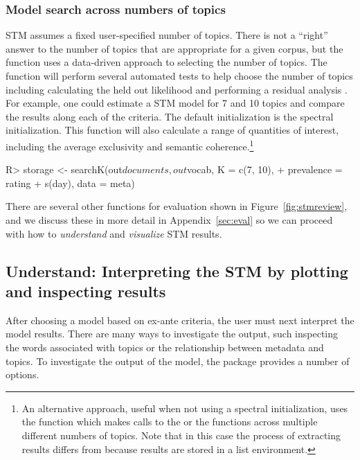 \documentclass[article,shortnames]{jss}
\begin{document}
\subsubsection{Model search across numbers of topics}

STM assumes a fixed user-specified number of topics. There is not a ``right'' answer to the number of topics that are appropriate for a given corpus, but the function  uses a data-driven approach to selecting the number of topics. The function will perform several automated tests to help choose the number of topics including calculating the held out likelihood \citep{wallach2009evaluation} and performing a residual analysis \citep{taddyestimation}. For example, one could estimate a STM model for 7 and 10 topics and compare the results along each of the criteria. The default initialization is the spectral initialization.  This function will also calculate a range of quantities of interest, including the average exclusivity and semantic coherence.\footnote{An alternative approach, useful when not using a spectral initialization, uses the  function which makes calls to the  or the  functions across multiple different numbers of topics. Note that in this case the process of extracting results differs from  because results are stored in a list environment.}


\begin{Schunk}
\begin{Sinput}
R> storage <- searchK(out$documents, out$vocab, K = c(7, 10),
+  prevalence =~ rating + s(day), data = meta)
\end{Sinput}
\end{Schunk}


 
There are several other functions for evaluation shown in Figure~\ref{fig:stmreview}, and we discuss these in more detail in Appendix~\ref{sec:eval} so we can proceed with how to \emph{understand} and \emph{visualize} STM results.

\subsection{Understand: Interpreting the STM by plotting and inspecting results}

After choosing a model based on ex-ante criteria, the user must next interpret the model results. There are many ways to investigate the output, such inspecting the words associated with topics or the relationship between metadata and topics. To investigate the output of the model, the  package provides a number of options.
\end{document}
